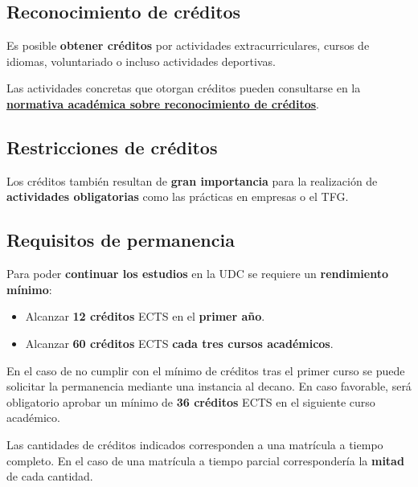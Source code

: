 \subsection{Reconocimiento de créditos}

Es posible \textbf{obtener créditos} por actividades extracurriculares, cursos de idiomas, voluntariado o incluso actividades deportivas.

\begin{infoBox}
    Las actividades concretas que otorgan créditos pueden consultarse en la \href{https://www.udc.es/gl/normativa/academica/}{\textbf{normativa académica sobre reconocimiento de créditos}}.
\end{infoBox}

\subsection{Restricciones de créditos}

Los créditos también resultan de \textbf{gran importancia} para la realización de \textbf{actividades obligatorias} como las prácticas en empresas o el \acrfull{TFG}.

\subsection{Requisitos de permanencia}

Para poder \textbf{continuar los estudios} en la \acrshort{UDC} se requiere un \textbf{rendimiento mínimo}:

\begin{itemize}
    \item Alcanzar \textbf{12 créditos} \acrshort{ECTS} en el \textbf{primer año}.

    \item Alcanzar \textbf{60 créditos} \acrshort{ECTS} \textbf{cada tres cursos académicos}.
\end{itemize}

\begin{warningBox}
    En el caso de no cumplir con el mínimo de créditos tras el primer curso se puede solicitar la permanencia mediante una instancia al decano. En caso favorable, será obligatorio aprobar un mínimo de \textbf{36 créditos} \acrshort{ECTS} en el siguiente curso académico.
\end{warningBox}

\begin{infoBox}
    Las cantidades de créditos indicados corresponden a una matrícula a tiempo completo. En el caso de una matrícula a tiempo parcial correspondería la \textbf{mitad} de cada cantidad.
\end{infoBox}

